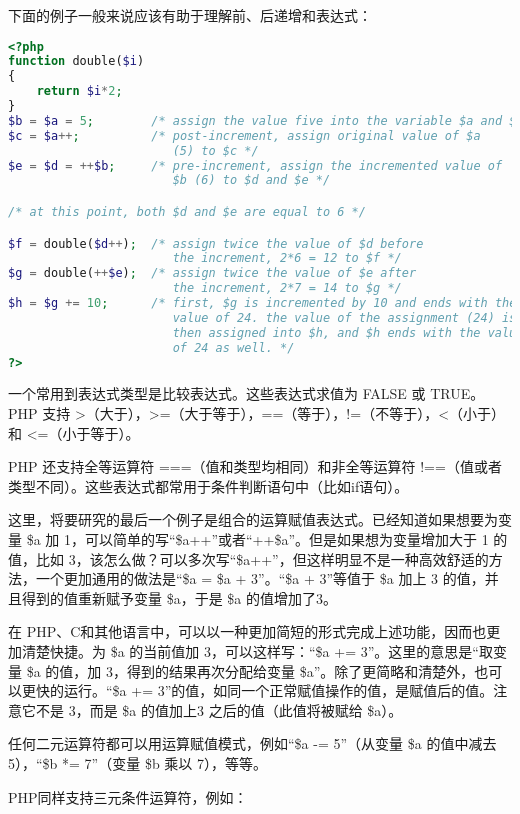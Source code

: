 下面的例子一般来说应该有助于理解前、后递增和表达式：


\begin{lstlisting}[language=PHP]
<?php
function double($i)
{
    return $i*2;
}
$b = $a = 5;        /* assign the value five into the variable $a and $b */
$c = $a++;          /* post-increment, assign original value of $a
                       (5) to $c */
$e = $d = ++$b;     /* pre-increment, assign the incremented value of
                       $b (6) to $d and $e */

/* at this point, both $d and $e are equal to 6 */

$f = double($d++);  /* assign twice the value of $d before
                       the increment, 2*6 = 12 to $f */
$g = double(++$e);  /* assign twice the value of $e after
                       the increment, 2*7 = 14 to $g */
$h = $g += 10;      /* first, $g is incremented by 10 and ends with the
                       value of 24. the value of the assignment (24) is
                       then assigned into $h, and $h ends with the value
                       of 24 as well. */
?>
\end{lstlisting}

一个常用到表达式类型是比较表达式。这些表达式求值为 FALSE 或 TRUE。PHP 支持 >（大于），>\/=（大于等于），=\/=（等于），!\/=（不等于），<（小于）和 <\/=（小于等于）。

PHP 还支持全等运算符 =\/=\/=（值和类型均相同）和非全等运算符 !\/=\/=（值或者类型不同）。这些表达式都常用于条件判断语句中（比如if语句）。

这里，将要研究的最后一个例子是组合的运算赋值表达式。已经知道如果想要为变量 \$a 加 1，可以简单的写“\$a++”或者“++\$a”。但是如果想为变量增加大于 1 的值，比如 3，该怎么做？可以多次写“\$a++”，但这样明显不是一种高效舒适的方法，一个更加通用的做法是“\$a = \$a + 3”。“\$a + 3”等值于 \$a 加上 3 的值，并且得到的值重新赋予变量 \$a，于是 \$a 的值增加了3。

在 PHP、C和其他语言中，可以以一种更加简短的形式完成上述功能，因而也更加清楚快捷。为 \$a 的当前值加 3，可以这样写：“\$a += 3”。这里的意思是“取变量 \$a 的值，加 3，得到的结果再次分配给变量 \$a”。除了更简略和清楚外，也可以更快的运行。“\$a += 3”的值，如同一个正常赋值操作的值，是赋值后的值。注意它不是 3，而是 \$a 的值加上3 之后的值（此值将被赋给 \$a）。

任何二元运算符都可以用运算赋值模式，例如“\$a -= 5”（从变量 \$a 的值中减去 5），“\$b *= 7”（变量 \$b 乘以 7），等等。

PHP同样支持三元条件运算符，例如：


